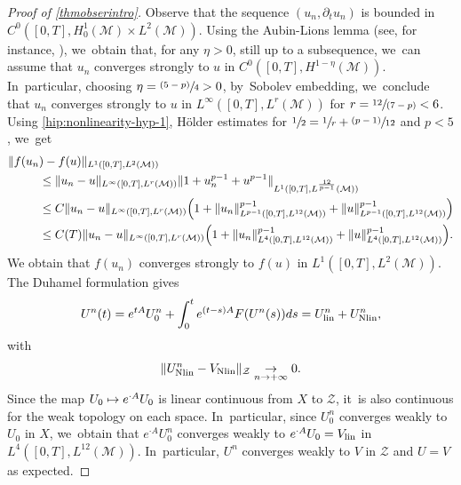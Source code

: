 \documentclass[10pt]{amsart}
\newcommand{\psfrac}[2]{\sfrac{(#1)}{#2}}
\newcommand{\spfrac}[2]{\sfrac{#1}{(#2)}}
\newcommand\mto{\mathchoice{\longmapsto}{\mapsto}{\mapsto}{\mapsto}}
\newcommand{\lin}{\textup{lin}}
\newcommand{\Nlin}{\textup{Nlin}}
\theoremstyle{definition}
\let\mc\mathcal
\newcommand{\M}{\mc{M}}
\providecommand{\norm}[1]{\lVert#1\rVert}
\begin{document}
\begin{proof}[Proof of \cref{thmobserintro}]
Observe that the sequence $(u_{n}, \partial_{t }u_{n})$ is bounded in $C^{0}([0, T],H_0^1(\M)\times L^2(\M))$. Using the Aubin-Lions lemma (see, for instance, \cite[Cor.\,4]{S:87}), we~obtain that, for any $\eta>0$, still up to a subsequence, we~can assume that $u_{n}$ converges strongly to $u$ in $C^{0}([0, T],H^{1-\eta}(\M))$. In~particular, choosing $\eta=\psfrac{5-p}{4}>0$, by~Sobolev embedding, we~conclude that $u_{n}$ converges strongly to $u$ in $L^{\infty}([0, T],L^{r}(\M))$ for $r=\spfrac{12}{7-p}<6$. Using \eqref{hip:nonlinearity-hyp-1}, Hölder estimates for $\sfrac{1}{2}=\sfrac{1}{r}+\psfrac{p-1}{12} $ and $p<5$, we~get
\begin{align*}
\|f(u_{n}&)-f(u)\|_{L^{1}([0, T], L^{2}(\M))}\\
&\leq \norm{u_{n}-u}_{L^{\infty}([0, T], L^{r}(\M))}\norm{1+ u_{n}^{p-1}+u^{p-1}}_{L^{1}([0, T],L^{\frac{12}{p-1}}(\M))}\\
&\leq C \norm{u_{n}-u}_{L^{\infty}([0,T], L^{r}(\M))}\Bigl(1+\norm{u_{n}}_{L^{p-1}([0, T],L^{12}(\M))}^{p-1}+\norm{u}_{L^{p-1}([0, T],L^{12}(\M))}^{p-1}\Bigr)\\
&\leq C(T) \norm{u_{n}-u}_{L^{\infty}([0,T], L^{r}(\M))}\Bigl(1+\norm{u_{n}}_{L^{4}([0, T],L^{12}(\M))}^{p-1}+\norm{u}_{L^{4}([0, T],L^{12}(\M))}^{p-1}\Bigr).
\end{align*}
We obtain that $f(u_{n})$ converges strongly to $f(u)$ in $L^{1}([0, T], L^{2}(\M))$. The Duhamel formulation gives
\begin{align*}
U^n(t)=e^{tA}U_0^n+\int_0^t e^{(t-s)A}F(U^n(s))ds=U_{\lin}^n+U_{\Nlin}^n,
\end{align*}
with
\begin{align}
\label{e:cvgNL}
\norm{U_{\Nlin}^n-V_{\Nlin}}_{\mc{Z}}\underset{n\to +\infty}{\to}0.
\end{align}
Since the map $U_0 \mto e^{\cdot A}U_0$ is linear continuous from $X$ to $\mc{Z}$, it~is also continuous for the weak topology on each space. In~particular, since $U_0^n$ converges weakly to $U_0$ in $X$, we~obtain that $e^{\cdot A}U_0^n$ converges weakly to $e^{\cdot A}U_0=V_{\lin}$ in $L^{4}([0, T],L^{12}(\M))$. In~particular, $U^n$ converges weakly to $V$ in $\mc{Z}$ and $U=V$ as expected.


\end{proof}
\end{document}
